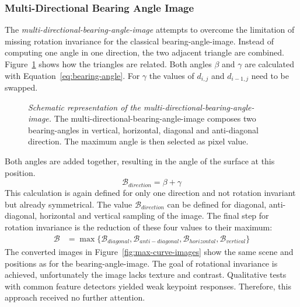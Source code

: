 \subsubsection{Multi-Directional Bearing Angle Image}

The \emph{\gls{multi-directional-bearing-angle-image}} attempts to overcome the limitation of missing rotation invariance for the classical \gls{bearing-angle-image}.
Instead of computing one angle in one direction, the two adjacent triangle are combined.
Figure~\ref{fig:max-curve} shows how the triangles are related.
Both angles $\beta$ and $\gamma$ are calculated with Equation~\ref{eq:bearing-angle}.
For $\gamma$ the values of $d_{i,j}$ and $d_{i-1,j}$ need to be swapped.
\begin{figure}
    \scalebox{0.9}{%
    
    }
    \caption[Schematic representation of the \gls{multi-directional-bearing-angle-image}]{\emph{Schematic representation of the \gls{multi-directional-bearing-angle-image}.} The \gls{multi-directional-bearing-angle-image} composes two \Glspl{bearing-angle} in vertical, horizontal, diagonal and anti-diagonal direction. The maximum angle is then selected as pixel value.}\label{fig:max-curve}
\end{figure}
Both angles are added together, resulting in the angle of the surface at this position.
\begin{equation}
    \mathcal{B_{\textit{direction}}}= \beta + \gamma
\end{equation}
This calculation is again defined for only one direction and not rotation invariant but already symmetrical.
The value $\mathcal{B_{\textit{direction}}}$ can be defined for diagonal, anti-diagonal, horizontal and vertical sampling of the image.
The final step for rotation invariance is the reduction of these four values to their maximum:
\vspace{-2mm}
\begin{align}
    \mathcal{B} &= \max{\{\mathcal{B}_{diagonal}, \mathcal{B}_{anti-diagonal}, \mathcal{B}_{horizontal}, \mathcal{B}_{vertical}\}}
\end{align}
The converted images in Figure~\ref{fig:max-curve-images} show the same scene and positions as for the \gls{bearing-angle-image}.
The goal of rotational invariance is achieved, unfortunately the image lacks texture and contrast.
Qualitative tests with common feature detectors yielded weak keypoint responses.
Therefore, this approach received no further attention.
